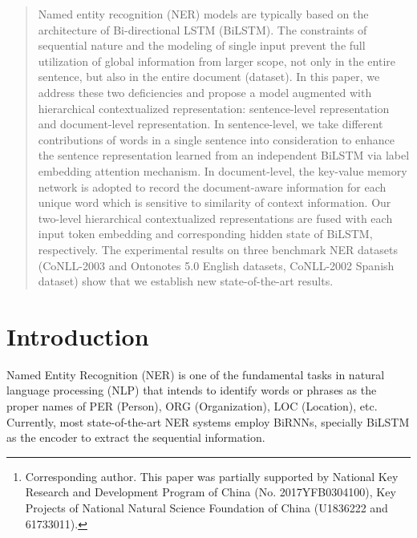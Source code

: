 \documentclass[letterpaper]{article} \usepackage{aaai20}  \usepackage{times}  \usepackage{helvet} \usepackage{courier}  \usepackage[hyphens]{url}  \usepackage{graphicx} \urlstyle{rm} \def\UrlFont{\rm}  \usepackage{graphicx}  \frenchspacing  \setlength{\pdfpagewidth}{8.5in}  \setlength{\pdfpageheight}{11in}
\author{
Ying Luo \textsuperscript{\rm 1,2,3},
Fengshun Xiao\textsuperscript{\rm 1,2,3},
Hai Zhao\textsuperscript{\rm 1,2,3,}\thanks{Corresponding author. This paper was partially supported by National Key Research and Development Program of China (No. 2017YFB0304100), 
  Key Projects of National Natural Science Foundation of China (U1836222 and 61733011).}\\
\textsuperscript{\rm 1}Department of Computer Science and Engineering, Shanghai Jiao Tong University \\
\textsuperscript{\rm 2}Key Laboratory of Shanghai Education Commission for Intelligent Interaction \\ and Cognitive Engineering, Shanghai Jiao Tong University, Shanghai, China\\
\textsuperscript{\rm 3}MoE Key Lab of Artificial Intelligence, AI Institute, Shanghai Jiao Tong University, Shanghai, China\\
\{kingln,  felixxiao\}@sjtu.edu.cn, zhaohai@cs.sjtu.edu.cn
}
\begin{document}
\maketitle

\begin{abstract}
Named entity recognition (NER) models are typically based on the architecture of Bi-directional LSTM (BiLSTM). The constraints of sequential nature and the modeling of single input prevent the full utilization of global information from larger scope, not only in the entire sentence, but also in the entire document (dataset). In this paper, we address these two deficiencies and propose a model augmented with hierarchical contextualized representation: sentence-level representation and document-level representation. In sentence-level, we take different contributions of words in a single sentence into consideration to enhance the sentence representation learned from an independent BiLSTM via label embedding attention mechanism. In document-level, the key-value memory network is adopted to record the document-aware information for each unique word which is sensitive to similarity of context information. Our two-level hierarchical contextualized representations are fused with each input token embedding and corresponding hidden state of BiLSTM, respectively. The experimental results on three benchmark NER datasets (CoNLL-2003 and Ontonotes 5.0 English datasets, CoNLL-2002 Spanish dataset) show that we establish new state-of-the-art results.
\end{abstract}

\section{Introduction}

Named Entity Recognition (NER) is one of the fundamental
tasks in natural language processing (NLP) that intends to  identify words or phrases as the proper names of  PER (Person), ORG (Organization), LOC (Location), etc. 
Currently, most state-of-the-art NER systems \cite{huang2015bidirectional,lample2016neural,ma2016end,chiu2016named} employ BiRNNs, specially BiLSTM \cite{hochreiter1997long} as the encoder to extract the sequential information. 
\end{document}
